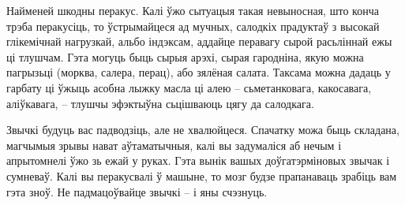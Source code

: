 Найменей шкодны перакус. 
Калі ўжо сытуацыя такая невыносная, што конча трэба перакусіць, то ўстрымайцеся ад мучных, салодкіх прадуктаў з высокай глікемічнай нагрузкай, альбо індэксам, аддайце перавагу сырой расьліннай ежы ці тлушчам. Гэта могуць быць сырыя арэхі, сырая гародніна, якую можна пагрызьці (морква, салера, перац), або зялёная салата. Таксама можна дадаць у гарбату ці ўжыць асобна лыжку масла ці алею – сьметанковага, какосавага, аліўкавага, – тлушчы эфэктыўна сьцішваюць цягу да салодкага.

Звычкі будуць вас падводзіць, але не хвалюйцеся. 
Спачатку можа быць складана, магчымыя зрывы нават аўтаматычныя, калі вы задумаліся аб нечым і апрытомнелі ўжо зь ежай у руках. Гэта вынік вашых доўгатэрміновых звычак і сумневаў. Калі вы перакусвалі ў машыне, то мозг будзе прапанаваць зрабіць вам гэта зноў. Не падмацоўвайце звычкі – і яны счэзнуць.
